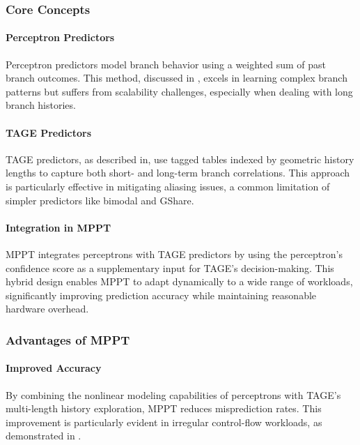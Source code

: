 \documentclass[10pt,journal,compsoc]{IEEEtran}
\begin{document}
\subsubsection*{Core Concepts}

\paragraph*{Perceptron Predictors} 
Perceptron predictors model branch behavior using a weighted sum of past branch outcomes. This method, discussed in \cite{josephSurveyDeepLearning2021a}, excels in learning complex branch patterns but suffers from scalability challenges, especially when dealing with long branch histories. 

\paragraph*{TAGE Predictors} 
TAGE predictors, as described in\cite{penneySurveyMachineLearning2019a}, use tagged tables indexed by geometric history lengths to capture both short- and long-term branch correlations. This approach is particularly effective in mitigating aliasing issues, a common limitation of simpler predictors like bimodal and GShare.

\paragraph*{Integration in MPPT}
MPPT integrates perceptrons with TAGE predictors by using the perceptron's confidence score as a supplementary input for TAGE’s decision-making. This hybrid design enables MPPT to adapt dynamically to a wide range of workloads, significantly improving prediction accuracy while maintaining reasonable hardware overhead.

\subsubsection*{Advantages of MPPT}

\paragraph*{Improved Accuracy} 
By combining the nonlinear modeling capabilities of perceptrons with TAGE’s multi-length history exploration, MPPT reduces misprediction rates. This improvement is particularly evident in irregular control-flow workloads, as demonstrated in \cite{SurveyTechniquesDynamica}.
\end{document}
